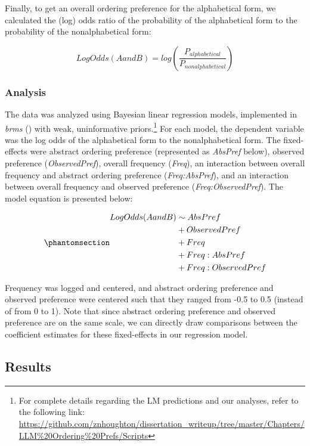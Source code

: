 \documentclass[
  12pt,
  letterpaper,
]{scrreport}
\begin{document}
Finally, to get an overall ordering preference for the alphabetical
form, we calculated the (log) odds ratio of the probability of the
alphabetical form to the probability of the nonalphabetical form:

\[
LogOdds(AandB) = log(\frac{P_{alphabetical}}{P_{nonalphabetical}})
\]

\subsubsection{Analysis}\label{analysis-2}

The data was analyzed using Bayesian linear regression models,
implemented in \emph{brms}
() with
weak, uninformative priors.\footnote{For complete details regarding the
  LM predictions and our analyses, refer to the following link:
  \url{https://github.com/znhoughton/dissertation_writeup/tree/master/Chapters/LLM\%20Ordering\%20Prefs/Scripts}}
For each model, the dependent variable was the log odds of the
alphabetical form to the nonalphabetical form. The fixed-effects were
abstract ordering preference (represented as \emph{AbsPref} below),
observed preference (\emph{ObservedPref}), overall frequency
(\emph{Freq}), an interaction between overall frequency and abstract
ordering preference (\emph{Freq:AbsPref}), and an interaction between
overall frequency and observed preference (\emph{Freq:ObservedPref}).
The model equation is presented below:

\begin{equation}\phantomsection\label{eq-model}{
\begin{aligned}
    LogOdds(AandB) & \sim AbsPref \\
      & + ObservedPref\\
      & + Freq\\
      & + Freq:AbsPref\\ 
      & + Freq:ObservedPref
\end{aligned}
}\end{equation}

\noindent Frequency was logged and centered, and abstract ordering
preference and observed preference were centered such that they ranged
from -0.5 to 0.5 (instead of from 0 to 1). Note that since abstract
ordering preference and observed preference are on the same scale, we
can directly draw comparisons between the coefficient estimates for
these fixed-effects in our regression model.

\subsection{Results}\label{results-5}
\end{document}
